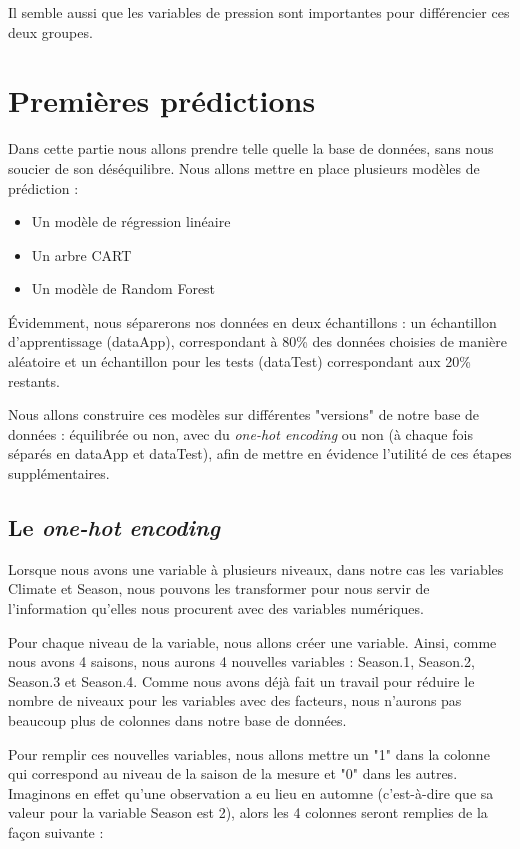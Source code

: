 \documentclass{article}
\begin{document}
Il semble aussi que les variables de pression sont importantes pour différencier ces deux groupes. 

\section{Premières prédictions}

Dans cette partie nous allons prendre telle quelle la base de données, sans nous soucier de son déséquilibre. Nous allons mettre en place plusieurs modèles de prédiction : 

\begin{itemize}
    \item Un modèle de régression linéaire
    \item Un arbre CART
    \item Un modèle de Random Forest
\end{itemize}

Évidemment, nous séparerons nos données en deux échantillons : un échantillon d'apprentissage (dataApp), correspondant à 80\% des données choisies de manière aléatoire et un échantillon pour les tests (dataTest) correspondant aux 20\% restants.

Nous allons construire ces modèles sur différentes "versions" de notre base de données : équilibrée ou non, avec du \emph{one-hot encoding} ou non (à chaque fois séparés en dataApp et dataTest), afin de mettre en évidence l'utilité de ces étapes supplémentaires.

\subsection{Le \emph{one-hot encoding}}

Lorsque nous avons une variable à plusieurs niveaux, dans notre cas les variables Climate et Season, nous pouvons les transformer pour nous servir de l'information qu'elles nous procurent avec des variables numériques. 

Pour chaque niveau de la variable, nous allons créer une variable. Ainsi, comme nous avons 4 saisons, nous aurons 4 nouvelles variables : Season.1, Season.2, Season.3 et Season.4. Comme nous avons déjà fait un travail pour réduire le nombre de niveaux pour les variables avec des facteurs, nous n'aurons pas beaucoup plus de colonnes dans notre base de données. 

Pour remplir ces nouvelles variables, nous allons mettre un "1" dans la colonne qui correspond au niveau de la saison de la mesure et "0" dans les autres. Imaginons en effet qu'une observation a eu lieu en automne (c'est-à-dire que sa valeur pour la variable Season est 2), alors les 4 colonnes seront remplies de la façon suivante : 
\end{document}
